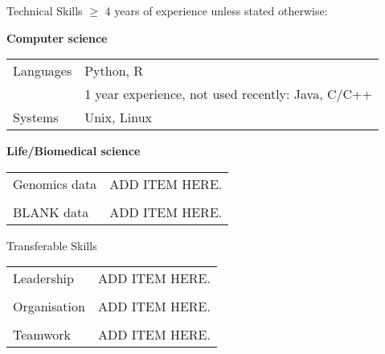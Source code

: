 \documentclass{resume} %
\newlength{\pcolleftwdth} %
\begin{document}
\begin{rSection}{Technical Skills}
\vspace{-0.3em} $\geq$ 4 years of experience unless stated otherwise:

{\bf Computer science}\smallskip\\
\begin{tabular}{@{}li{\pcolwdth}}
\parbox[t][][t]{\pcolleftwdth}{Languages}
    & \item Python, R \\
    & \item 1 year experience, not used recently: Java, C/C++ \smallskip\\
\parbox[t][][t]{\pcolleftwdth}{Systems}
    & \item Unix, Linux \smallskip\\
\end{tabular}\par
\ifresume %
\else %
    \pointskip
\fi

{\bf Life/Biomedical science}\smallskip\\
\begin{tabular}{@{}li{\pcolwdth}}
\parbox[t][][t]{\pcolleftwdth}{Genomics data}
    & \item ADD ITEM HERE.\\\smallskip\\
\parbox[t][][t]{\pcolleftwdth}{BLANK data}
    & \item ADD ITEM HERE.\\
\end{tabular}\par


\end{rSection}


\begin{rSection}{Transferable Skills}

\begin{tabular}{@{}li{\pcolwdth}}
\parbox[t][][t]{\pcolleftwdth}{Leadership}
    & \item ADD ITEM HERE.\\\smallskip\\
\parbox[t][][t]{\pcolleftwdth}{Organisation}
    & \item ADD ITEM HERE.\\\smallskip\\
\parbox[t][][t]{\pcolleftwdth}{Teamwork}
    & \item ADD ITEM HERE.\\
\end{tabular}\par

\end{rSection}
\end{document}
